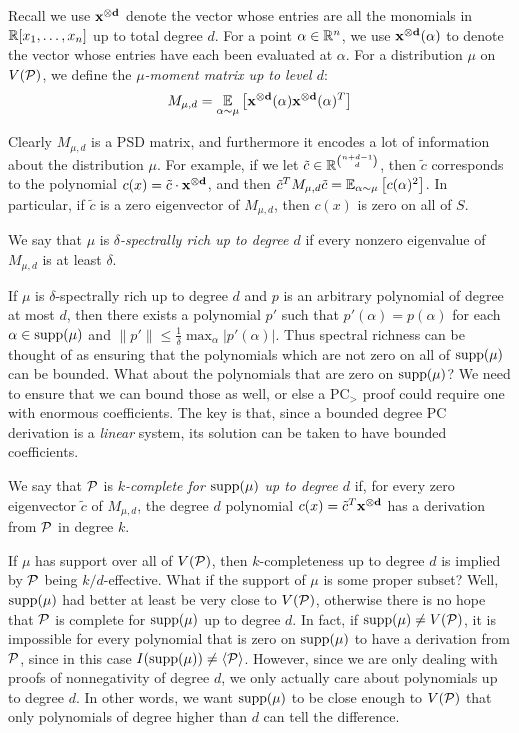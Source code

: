 \begin{definition}
Recall we use $\mathbf{x^{\otimes d}}$ denote the vector whose entries are all the monomials in $\mathbb R[x_1,\dots,x_n]$ up to total degree $d$. 
For a point $\alpha \in \mathbb R^n$, we use $\mathbf{x^{\otimes d}}(\alpha)$ to denote the vector whose entries have each been evaluated at $\alpha$.
For a distribution $\mu$ on $V(\mathcal P)$, we define the \emph{$\mu$-moment matrix up to level $d$}:
\[M_{\mu,d} = \operatorname*{\mathbb{E}}_{\alpha \sim \mu}\left[\mathbf{x^{\otimes d}}(\alpha)\mathbf{x^{\otimes d}}(\alpha)^T\right]\]
\end{definition}
Clearly $M_{\mu,d}$ is a PSD matrix, and furthermore it encodes a lot of information about the distribution $\mu$. For example, if we let $\tilde{c} \in \mathbb R^{\binom{n+d-1}{d}}$, then $\tilde{c}$ corresponds to the polynomial $c(x) = \tilde{c} \cdot \mathbf{x^{\otimes d}}$, and then $\tilde{c}^TM_{\mu,d}\tilde{c} = \operatorname*{\mathbb{E}}_{\alpha \sim \mu}\left[c(\alpha)^2\right]$.
In particular, if $\tilde{c}$ is a zero eigenvector of $M_{\mu,d}$, then $c(x)$ is zero on all of $S$.  
\begin{definition}
We say that $\mu$ is \emph{$\delta$-spectrally rich up to degree $d$} if every nonzero eigenvalue of $M_{\mu,d}$ is at least $\delta$. 
\end{definition}
If $\mu$ is $\delta$-spectrally rich up to degree $d$ and $p$ is an arbitrary polynomial of degree at most $d$, then there exists a polynomial $p'$ such that $p'(\alpha) = p(\alpha)$ for each $\alpha \in \operatorname{supp}(\mu)$ and $\|p'\| \leq \frac{1}{\delta} \max_\alpha |p'(\alpha)|$. Thus spectral richness can be thought of as ensuring that the polynomials which are not zero on all of $\operatorname{supp}(\mu)$ can be bounded. What about the polynomials that are zero on $\operatorname{supp}(\mu)$? We need to ensure that we can bound those as well, or else a PC$_>$ proof could require one with enormous coefficients. The key is that, since a bounded degree PC derivation is a \emph{linear} system, its solution can be taken to have bounded coefficients.
\begin{definition}
We say that $\mathcal P$ is \emph{$k$-complete for $\operatorname{supp}(\mu)$ up to degree $d$} if, for every zero eigenvector $\tilde{c}$ of $M_{\mu,d}$, the degree $d$ polynomial $c(x) = \tilde{c}^T\mathbf{x^{\otimes d}}$ has a derivation from $\mathcal P$ in degree $k$.
\end{definition}
If $\mu$ has support over all of $V(\mathcal P)$, then $k$-completeness up to degree $d$ is implied by $\mathcal P$ being $k/d$-effective. 
What if the support of $\mu$ is some proper subset? Well, $\operatorname{supp}(\mu)$ had better at least be very close to $V(\mathcal P)$, otherwise there is no hope that $\mathcal P$ is complete for $\operatorname{supp}(\mu)$ up to degree $d$. In fact, if $\operatorname{supp}(\mu) \neq V(\mathcal P)$, it is impossible for every polynomial that is zero on $\operatorname{supp}(\mu)$ to have a derivation from $\mathcal P$, since in this case $I(\operatorname{supp}(\mu)) \neq \langle \mathcal P \rangle$. However, since we are only dealing with proofs of nonnegativity of degree $d$, we only actually care about polynomials up to degree $d$. In other words, we want $\operatorname{supp}(\mu)$ to be close enough to $V(\mathcal P)$ that only polynomials of degree higher than $d$ can tell the difference.
